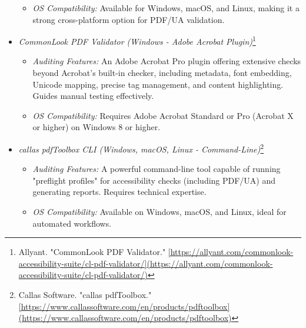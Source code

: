 \begin{itemize}
\begin{itemize}
\item \emph{OS Compatibility:} Available for Windows, macOS, and Linux, making it a strong cross-platform option for PDF/UA validation.
\end{itemize}
\item \emph{CommonLook PDF Validator (Windows - Adobe Acrobat Plugin)}\footnote{Allyant. "CommonLook PDF Validator." \url{[https://allyant.com/commonlook-accessibility-suite/cl-pdf-validator/](https://allyant.com/commonlook-accessibility-suite/cl-pdf-validator/)}}
\begin{itemize}
\item \emph{Auditing Features:} An Adobe Acrobat Pro plugin offering extensive checks beyond Acrobat's built-in checker, including metadata, font embedding, Unicode mapping, precise tag management, and content highlighting. Guides manual testing effectively.
\item \emph{OS Compatibility:} Requires Adobe Acrobat Standard or Pro (Acrobat X or higher) on Windows 8 or higher.
\end{itemize}
\item \emph{callas pdfToolbox CLI (Windows, macOS, Linux - Command-Line)}\footnote{Callas Software. "callas pdfToolbox." \url{[https://www.callassoftware.com/en/products/pdftoolbox](https://www.callassoftware.com/en/products/pdftoolbox)}}
\begin{itemize}
\item \emph{Auditing Features:} A powerful command-line tool capable of running "preflight profiles" for accessibility checks (including PDF/UA) and generating reports. Requires technical expertise.
\item \emph{OS Compatibility:} Available on Windows, macOS, and Linux, ideal for automated workflows.
\end{itemize}
\end{itemize}

